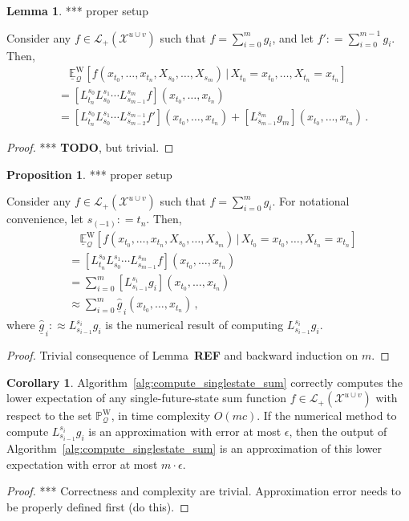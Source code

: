\documentclass[10pt]{paper}
\theoremstyle{definition}
\newtheorem{proposition}[theorem]{Proposition}
\newtheorem{corollary}[theorem]{Corollary}
\newtheorem{lemma}[theorem]{Lemma}
\newcommand{\states}{\mathcal{X}}
\newcommand{\processes}{\mathbb{P}}
\newcommand{\wprocesses}{\processes^{\mathrm{W}}}
\newcommand{\gambles}{\mathcal{L}}
\newcommand{\rateset}{\mathcal{Q}}
\newcommand{\coloneqq}{:\!=}
\begin{document}
\begin{lemma}
*** proper setup

Consider any $f\in\gambles_+(\states^{u\cup v})$ such that $f=\sum_{i=0}^m g_i$, and let $f'\coloneqq \sum_{i=0}^{m-1} g_i$. Then,
\begin{align*}
 &\quad \underline{\mathbb{E}}_\rateset^\mathrm{W}[f(x_{t_0},\ldots,x_{t_n},X_{s_0},\ldots,X_{s_m})\,\vert\,X_{t_0}=x_{t_0},\ldots,X_{t_n}=x_{t_n}] \\
 &= \left[L_{t_n}^{s_0}L_{s_0}^{s_1}\cdots L_{s_{m-1}}^{s_m}f\right](x_{t_0},\ldots,x_{t_n}) \\
 &= \left[L_{t_n}^{s_0}L_{s_0}^{s_1}\cdots L_{s_{m-2}}^{s_{m-1}}f' \right](x_{t_0},\ldots,x_{t_n}) + \left[L_{s_{m-1}}^{s_m}g_m\right](x_{t_0},\ldots,x_{t_n})\,.
\end{align*}
\end{lemma}
\begin{proof}
*** {\bf TODO}, but trivial.
\end{proof}

\begin{proposition}
*** proper setup

Consider any $f\in\gambles_+(\states^{u\cup v})$ such that $f=\sum_{i=0}^m g_i$. For notational convenience, let $s_{(-1)}\coloneqq t_n$. Then,
\begin{align*}
 &\quad \underline{\mathbb{E}}_\rateset^\mathrm{W}[f(x_{t_0},\ldots,x_{t_n},X_{s_0},\ldots,X_{s_m})\,\vert\,X_{t_0}=x_{t_0},\ldots,X_{t_n}=x_{t_n}] \\
 &= \left[L_{t_n}^{s_0}L_{s_0}^{s_1}\cdots L_{s_{m-1}}^{s_m}f\right](x_{t_0},\ldots,x_{t_n}) \\
 &= \sum_{i=0}^m \left[L_{s_{i-1}}^{s_i}g_i\right](x_{t_0},\ldots,x_{t_n}) \\
 &\approx \sum_{i=0}^m \hat{\underline{g}}_{\,i}(x_{t_0},\ldots,x_{t_n})\,,
\end{align*}
where $\hat{\underline{g}}_{\,i}:\!\approx L_{s_{i-1}}^{s_i}g_i$ is the numerical result of computing $L_{s_{i-1}}^{s_i}g_i$.
\end{proposition}
\begin{proof}
Trivial consequence of Lemma~{\bf REF} and backward induction on $m$.
\end{proof}

\begin{corollary}
Algorithm~\ref{alg:compute_singlestate_sum} correctly computes the lower expectation of any single-future-state sum function $f\in\gambles_+(\states^{u\cup v})$ with respect to the set $\wprocesses_\rateset$, in time complexity $O(mc)$. If the numerical method to compute $L_{s_{i-1}}^{s_i}g_i$ is an approximation with error at most $\epsilon$, then the output of Algorithm~\ref{alg:compute_singlestate_sum} is an approximation of this lower expectation with error at most $m\cdot\epsilon$.
\end{corollary}
\begin{proof}
*** Correctness and complexity are trivial. Approximation error needs to be properly defined first (do this).
\end{proof}
\end{document}
